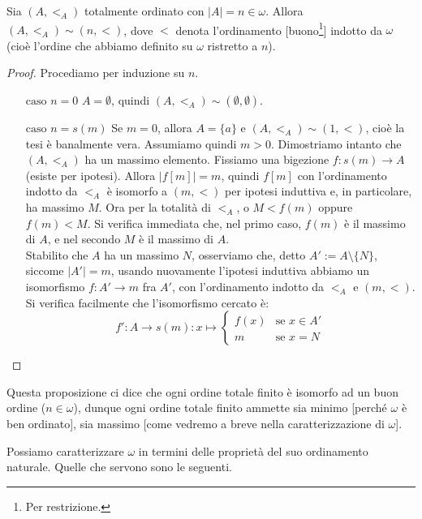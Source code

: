 \documentclass[11pt]{scrartcl}
\begin{document}
\begin{remark}
	Sia $(A,<_A)$ totalmente ordinato con $|A| = n \in \omega$. Allora $(A,<_A) \sim (n,<)$, dove $<$ denota l'ordinamento [buono\footnote{Per restrizione.}] indotto da $\omega$ (cioè l'ordine che abbiamo definito su $\omega$ ristretto a $n$).
\end{remark}

\begin{proof}
	Procediamo per induzione su $n$.
	\begin{itemize}
		\item[$\boxed{\text{caso $n = 0$}}$] $A = \emptyset$, quindi $(A,<_A) \sim (\emptyset,\emptyset)$.
		\item[$\boxed{\text{caso $n = s(m)$}}$] Se $m = 0$, allora $A = \{a\}$ e $(A,<_A) \sim (1,<)$, cioè la tesi è banalmente vera. Assumiamo quindi $m>0$. Dimostriamo intanto che $(A,<_A)$ ha un massimo elemento.
		Fissiamo una bigezione $f : s(m) \rightarrow A$ (esiste per ipotesi). Allora $|f[m]| = m$, quindi $f[m]$ con l'ordinamento indotto da $<_A$ è isomorfo a $(m,<)$ per ipotesi induttiva e, in particolare, ha massimo $M$. Ora per la totalità di $<_A$,
		o $M < f(m)$ oppure $f(m)<M$. Si verifica immediata che, nel primo caso, $f(m)$ è il massimo di $A$, e nel secondo $M$ è il massimo di $A$.\\
		Stabilito che $A$ ha un massimo $N$, osserviamo che, detto $A' := A \setminus\{N\}$, siccome $|A'| = m$, usando nuovamente l'ipotesi induttiva abbiamo un isomorfismo $f : A' \rightarrow m$ fra $A'$, con l'ordinamento indotto da $<_A$ e $(m,<)$.
		Si verifica facilmente che l'isomorfismo cercato è:
		\[ f' : A \longrightarrow s(m) : x \longmapsto \begin{cases}
			f(x) &\text{se $x \in A'$} \\
			m &\text{se $x = N$}
		\end{cases}
			\]
	\end{itemize}
\end{proof}

\begin{remark}
	Questa proposizione ci dice che ogni ordine totale finito è isomorfo ad un buon ordine ($n \in \omega$), dunque ogni ordine totale finito ammette sia minimo [perché $\omega$ è ben ordinato], sia massimo [come vedremo a breve nella caratterizzazione di $\omega$].
\end{remark}

Possiamo caratterizzare $\omega$ in termini delle proprietà del suo ordinamento naturale. Quelle che servono sono le seguenti.
\end{document}
